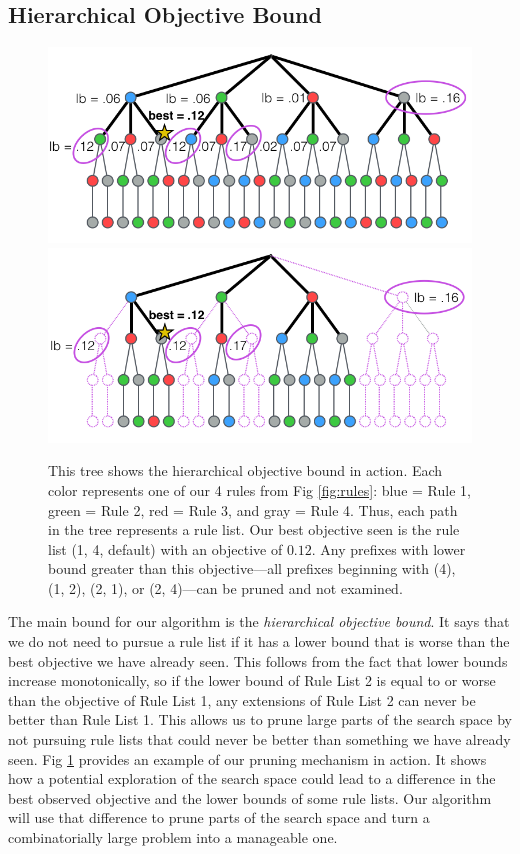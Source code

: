 \subsection{Hierarchical Objective Bound}
\begin{figure}[t!]
\includegraphics[width=\textwidth]{figs/branch-and-bound-tree.png}
\includegraphics[width=\textwidth]{figs/branch-and-bound-tree-pruned.png}
\caption[Objective bound]{This tree shows the hierarchical objective bound in action.
Each color represents one of our 4 rules from Fig \ref{fig:rules}: blue = Rule 1, green = Rule 2, red = Rule 3, and gray = Rule 4.
Thus, each path in the tree represents a rule list.
Our best objective seen is the rule list (1, 4, default) with an objective of $0.12$.
Any prefixes with lower bound greater than this objective---all prefixes beginning with (4), (1, 2), (2, 1), or (2, 4)---can be pruned and not examined.
\label{fig:objective-bound}}
\end{figure}

The main bound for our algorithm is the \textit{hierarchical objective bound}. 
It says that we do not need to pursue a rule list if it has a lower bound that is worse than the best objective we have already seen.
This follows from the fact that lower bounds increase monotonically, so if the lower bound of Rule List 2 is equal to or worse than the objective of Rule List 1, any extensions of Rule List 2 can never be better than Rule List 1.
This allows us to prune large parts of the search space by not pursuing rule lists that could never be better than something we have already seen.
Fig \ref{fig:objective-bound} provides an example of our pruning mechanism in action.
It shows how a potential exploration of the search space could lead to a difference in the best observed objective and the lower bounds of some rule lists.
Our algorithm will use that difference to prune parts of the search space and turn a combinatorially large problem into a manageable one.

